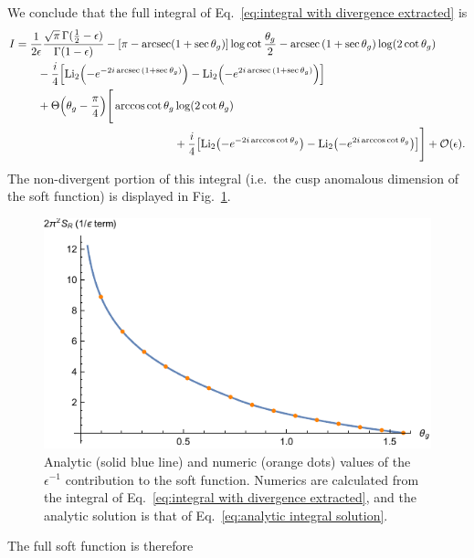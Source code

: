 \documentclass[11pt,twoside,reqno]{amsart}
\theoremstyle{plain}
\theoremstyle{remark}
\theoremstyle{definition}
\theoremstyle{remark}
\theoremstyle{definition}
\theoremstyle{definition}
\newcommand{\cO}{\mathcal{O}}
\newcommand{\Li}{\mathrm{Li}}
\begin{document}
	We conclude that the full integral of Eq.~\ref{eq:integral with divergence extracted} is
	\begin{equation}\label{eq:analytic integral solution}
	\begin{aligned}
		I &= \frac{1}{2\epsilon}\frac{\sqrt{\pi} \, \Gamma(\frac{1}{2} - \epsilon)}{\Gamma(1 - \epsilon)} - \qty[\pi - \arcsec(1 + \sec\theta_g)]\log\cot\frac{\theta_g}{2} - \arcsec\qty(1 + \sec\theta_g) \log(2\cot\theta_g) \\
			&\qquad - \frac{i}{4}\qty[\Li_2\qty(-e^{-2i\arcsec\qty(1 + \sec\theta_g)}) - \Li_2\qty(-e^{2i\arcsec\qty(1 + \sec\theta_g)})] \\
			&\qquad+ \Theta\qty(\theta_g - \frac{\pi}{4})\Bigg[ \arccos\cot\theta_g \log(2\cot\theta_g) \\
			&\hspace{5cm}+ \frac{i}{4}\qty[\Li_2\qty(-e^{-2i\arccos\cot\theta_g}) - \Li_2\qty(-e^{2i\arccos\cot\theta_g})] \Bigg] + \cO(\epsilon).
	\end{aligned}
	\end{equation}
	The non-divergent portion of this integral (i.e.\ the cusp anomalous dimension of the soft function) is displayed in Fig.~\ref{fig:non-divergent integral}.
	\begin{figure}
		\includegraphics[width=0.75\columnwidth]{figures/full_non_divergent.pdf}
		\caption{\label{fig:non-divergent integral} Analytic (solid blue line) and numeric (orange dots) values of the $\epsilon^{-1}$ contribution to the soft function. Numerics are calculated from the integral of Eq.~\ref{eq:integral with divergence extracted}, and the analytic solution is that of Eq.~\ref{eq:analytic integral solution}.}
	\end{figure}
	The full soft function is therefore
\end{document}
